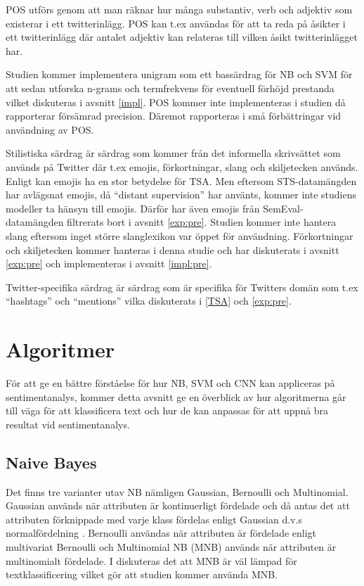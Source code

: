 \documentclass{kaumasters} %
\begin{document}
POS utförs genom att man räknar hur många substantiv, verb och adjektiv som existerar i ett twitterinlägg. POS kan t.ex användas för att ta reda på åsikter i ett twitterinlägg där antalet adjektiv kan relateras till vilken åsikt twitterinlägget har.

Studien kommer implementera unigram som ett bassärdrag för NB och SVM för att sedan utforska n-grams och termfrekvens för eventuell förhöjd prestanda vilket diskuteras i avsnitt \ref{impl}. POS kommer inte implementeras i studien då \cite{go2009twitter, feature:001} rapporterar försämrad precision. Däremot rapporteras i \cite{feature:002} små förbättringar vid användning av POS.

Stilistiska särdrag är särdrag som kommer från det informella skrivsättet som används på Twitter där t.ex emojis, förkortningar, slang och skiljetecken används. Enligt \cite{feature:002} kan emojis ha en stor betydelse för TSA. Men eftersom STS-datamängden har avlägsnat emojis, då “distant supervision” \cite{sts:001} har använts, kommer inte studiens modeller ta hänsyn till emojis. Därför har även emojis från SemEval-datamängden filtrerats bort i avsnitt \ref{exp:pre}. Studien kommer inte hantera slang eftersom inget större slanglexikon var öppet för användning. 
Förkortningar och skiljetecken kommer hanteras i denna studie och har diskuterats i avsnitt \ref{exp:pre} och implementeras i avsnitt \ref{impl:pre}.

Twitter-specifika särdrag är särdrag som är specifika för Twitters domän som t.ex “hashtags” och “mentions” vilka diskuterats i \ref{TSA} och \ref{exp:pre}.




\section{Algoritmer}
För att ge en bättre förståelse för hur NB, SVM och CNN kan appliceras på sentimentanalys, kommer detta avsnitt ge en överblick av hur algoritmerna går till väga för att klassificera text och hur de kan anpassas för att uppnå bra resultat vid sentimentanalys.

\subsection{Naive Bayes}
Det finns tre varianter utav NB nämligen Gaussian, Bernoulli och Multinomial. Gaussian används när attributen är kontinuerligt fördelade och då antas det att attributen förknippade med varje klass fördelas enligt Gaussian d.v.s normalfördelning \cite{nb:002}. Bernoulli användas när attributen är fördelade enligt multivariat Bernoulli \cite{nb:004} och Multinomial NB (MNB) används när attributen är multinomialt fördelade. I \cite{nb:003} diskuteras det att MNB är väl lämpad för textklassificering vilket gör att studien kommer använda MNB.
\end{document}
